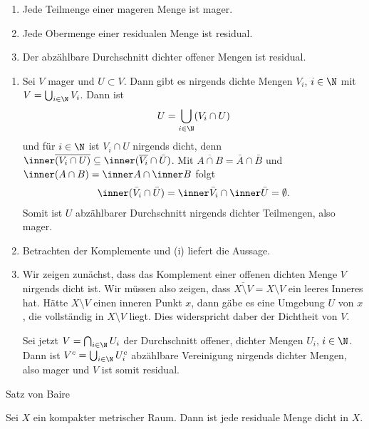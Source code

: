 \begin{lemma}
\renewcommand{\labelenumi}{(\roman{enumi})}
  \begin{enumerate}
  \item Jede Teilmenge einer mageren Menge ist mager.
  \item Jede Obermenge einer residualen Menge ist residual.
  \item Der abzählbare Durchschnitt dichter offener Mengen ist residual.
  \end{enumerate}
\end{lemma}
\begin{beweis}
\renewcommand{\labelenumi}{(\roman{enumi})}
  \begin{enumerate}
  \item Sei $V$ mager und $U \subset V$. Dann gibt es nirgends dichte Mengen $V_i$, $ i \in \N$ mit $V = \bigcup_{i \in \N} V_i$. Dann ist 
    \begin{align*}
      U = \bigcup_{i \in \N} ( V_i \cap U)
    \end{align*}
und für $ i\in \N$ ist $V_i \cap U$ nirgends dicht, denn $\inner \overline{(V_i \cap U)} \subseteq \inner (\overline {V_i} \cap \bar U)$. Mit $\overline{A \cap B} = \bar A \cap \bar B$ und $\inner (A \cap B) = \inner A \cap \inner B$ folgt
\begin{align*}
  \inner(\bar V_i \cap \bar U) = \inner \bar V_i \cap \inner \bar U = \emptyset.
\end{align*}
Somit ist $U$ abzählbarer Durchschnitt nirgends dichter Teilmengen, also mager.
\item Betrachten der Komplemente und (i) liefert die Aussage. 
\item Wir zeigen zunächst, dass das Komplement einer offenen dichten Menge $V$ nirgends dicht ist. Wir müssen also zeigen, dass $\overline {X\setminus V} = X \setminus V$ ein leeres Inneres hat. 
Hätte $X \setminus V$ einen inneren Punkt $x$, dann gäbe es eine Umgebung $U$ von $x$, die vollständig in $X \setminus V$ liegt. Dies widerspricht daber der Dichtheit von $V$. 

Sei jetzt $V = \bigcap_{i\in \N} U_i$ der Durchschnitt offener, dichter Mengen $U_i$, $i \in \N$.
Dann ist $V^c = \bigcup_{ i \in \N} U_i^c$ abzählbare Vereinigung nirgends dichter Mengen, also mager und $V$ ist somit residual.
  \end{enumerate}
\end{beweis}
\begin{satz} Satz von Baire
  
Sei $X$ ein kompakter metrischer Raum. Dann ist jede residuale Menge dicht in $X$.
\end{satz}
